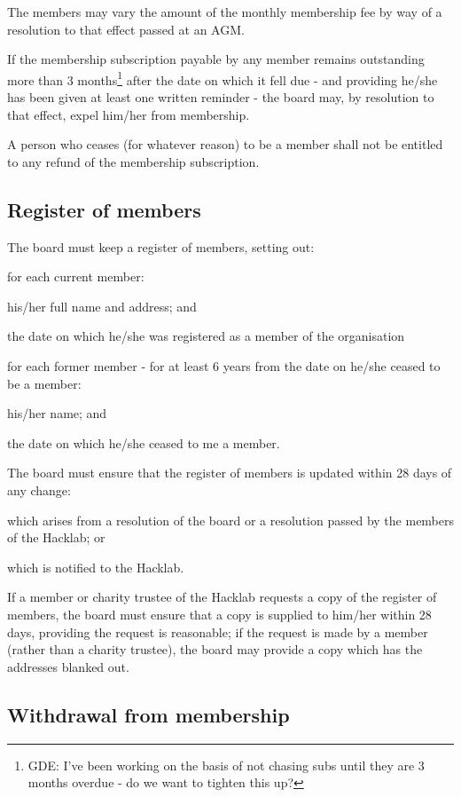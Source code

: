 \documentclass{article}
\begin{document}
\clause The members may vary the amount of the monthly membership fee
by way of a resolution to that effect passed at an AGM.

\clause If the membership subscription payable by any member remains
outstanding more than 3 months\footnote{GDE: I've been working on the
  basis of not chasing subs until they are 3 months overdue - do we
  want to tighten this up?} after the date on which it fell due - and
providing he/she has been given at least one written reminder - the
board may, by resolution to that effect, expel him/her from membership.

\clause A person who ceases (for whatever reason) to be a member shall
not be entitled to any refund of the membership subscription.

\subsection{Register of members}

\clause The board must keep a register of members, setting out:

\subclause for each current member:

\subsubclause his/her full name and address; and

\subsubclause the date on which he/she was registered as a member of
the organisation

\subclause for each former member - for at least 6 years from the date
on he/she ceased to be a member:

\subsubclause his/her name; and

\subsubclause the date on which he/she ceased to me a member.

\clause The board must ensure that the register of members is updated
within 28 days of any change:

\subclause which arises from a resolution of the board or a resolution
passed by the members of the Hacklab; or

\subclause which is notified to the Hacklab.

\clause If a member or charity trustee of the Hacklab requests a copy
of the register of members, the board must ensure that a copy is
supplied to him/her within 28 days, providing the request is
reasonable; if the request is made by a member (rather than a charity
trustee), the board may provide a copy which has the addresses blanked
out.

\subsection{Withdrawal from membership}
\end{document}
